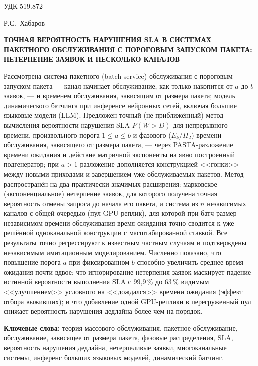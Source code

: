 \documentclass[12pt,a4paper]{article}
\newcommand{\keywordslabel}{\textbf{Ключевые слова: }}
\begin{document}
\sloppy

\noindent УДК 519.872

\bigskip
\noindent Р.С.~Хабаров


\bigskip
\begin{center}
\begin{minipage}{0.9\linewidth}
\centering
{\large\bfseries ТОЧНАЯ ВЕРОЯТНОСТЬ НАРУШЕНИЯ SLA В СИСТЕМАХ ПАКЕТНОГО ОБСЛУЖИВАНИЯ С ПОРОГОВЫМ ЗАПУСКОМ ПАКЕТА: НЕТЕРПЕНИЕ ЗАЯВОК И НЕСКОЛЬКО КАНАЛОВ}
\end{minipage}
\end{center}

\bigskip
\noindent\small
Рассмотрена система пакетного (batch-service) обслуживания с пороговым запуском пакета --- канал начинает обслуживание, как только накопится от $a$ до $b$ заявок, --- и временем обслуживания, зависящим от размера пакета; модель динамического батчинга при инференсе нейронных сетей, включая большие языковые модели (LLM). Предложен точный (не приближённый) метод вычисления вероятности нарушения SLA $P(W>D)$ для непрерывного времени, произвольного порога $1\le a\le b$ и фазового ($E_k$/$H_2$) времени обслуживания, зависящего от размера пакета, --- через PASTA-разложение времени ожидания и действие матричной экспоненты на явно построенный подгенератор; при $a>1$ разложение дополняется конструкцией <<гонки>> между новыми приходами и завершением уже обслуживаемых пакетов. Метод распространён на два практически значимых расширения: марковское (экспоненциальное) нетерпение заявок, для которого получена точная вероятность отмены запроса до начала его пакета, и система из $n$ независимых каналов с общей очередью (пул GPU-реплик), для которой при батч-размер-независимом времени обслуживания время ожидания точно сводится к уже решённой одноканальной конструкции с масштабированной ставкой. Все результаты точно регрессируют к известным частным случаям и подтверждены независимым имитационным моделированием. Численно показано, что повышение порога $a$ при фиксированном $b$ способно увеличить среднее время ожидания почти вдвое; что игнорирование нетерпения заявок маскирует падение истинной вероятности выполнения SLA с 99,9\,\% до 63\,\% видимым <<улучшением>> условного на <<дождался>> времени ожидания (эффект отбора выживших); и что добавление одной GPU-реплики в перегруженный пул снижает вероятность нарушения дедлайна более чем на порядок.

\medskip
\noindent\keywordslabel теория массового обслуживания, пакетное обслуживание, обслуживание, зависящее от размера пакета, фазовые распределения, SLA, вероятность нарушения дедлайна, нетерпеливые заявки, многоканальные системы, инференс больших языковых моделей, динамический батчинг.
\normalsize
\end{document}
